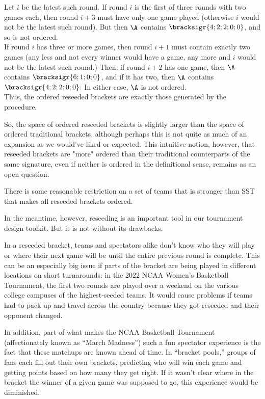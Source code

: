 {{    Let $i$ be the latest such round. If round $i$ is the first of three rounds with two games each, then round $i+3$ must have only one game played (otherwise $i$ would not be the latest such round). But then $\A$ contains $\bracksigr{4;2;2;0;0}$, and so is not ordered.\\
    
    If round $i$ has three or more games, then round $i+1$ must contain exactly two games (any less and not every winner would have a game, any more and $i$ would not be the latest such round.) Then, if round $i+2$ has one game, then $\A$ contains $\bracksigr{6;1;0;0}$, and if it has two, then $\A$ contains $\bracksigr{4;2;2;0;0}.$ In either case, $\A$ is not ordered.\\

    Thus, the ordered reseeded brackets are exactly those generated by the procedure.
}{}

So, the space of ordered reseeded brackets is slightly larger than the space of ordered traditional brackets, although perhaps this is not quite as much of an expansion as we would've liked or expected. This intuitive notion, however, that reseeded brackets are "more" ordered than their traditional counterparts of the same signature, even if neither is ordered in the definitional sense, remains as an open question.

\begin{conj}{}{}
    There is some reasonable restriction on a set of teams that is stronger than SST that makes all reseeded brackets ordered.
\end{conj}

In the meantime, however, reseeding is an important tool in our tournament design toolkit. But it is not without its drawbacks. 

In a reseeded bracket, teams and spectators alike don't know who they will play or where their next game will be until the entire previous round is complete. This can be an especially big issue if parts of the bracket are being played in different locations on short turnarounds: in the 2022 NCAA Women's Basketball Tournament, the first two rounds are played over a weekend on the various college campuses of the highest-seeded teams. It would cause problems if teams had to pack up and travel across the country because they got reseeded and their opponent changed.

In addition, part of what makes the NCAA Basketball Tournament (affectionately known as ``March Madness'') such a fun spectator experience is the fact that these matchups are known ahead of time. In ``bracket pools,'' groups of fans each fill out their own brackets, predicting who will win each game and getting points based on how many they get right. If it wasn't clear where in the bracket the winner of a given game was supposed to go, this experience would be diminished.

}
